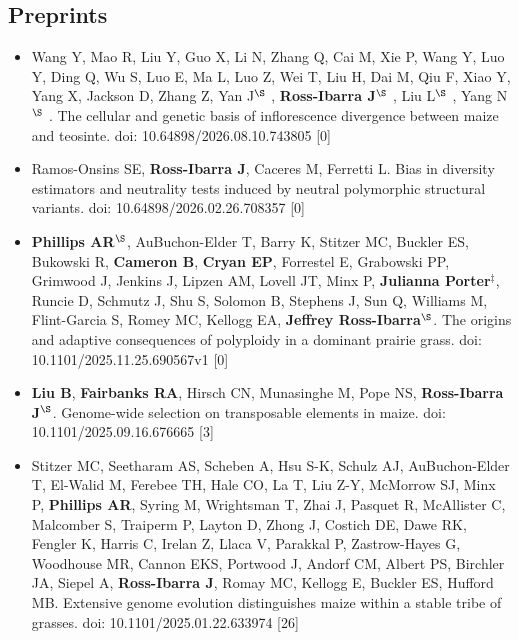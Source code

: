 \documentclass[letterpaper,10pt]{article}
\begin{document}
\subsection*{Preprints}
\begin{itemize}
  \setlength\itemsep{0ex}

\item Wang Y, Mao R, Liu Y, Guo X, Li N, Zhang Q, Cai M, Xie P, Wang Y, Luo Y, Ding Q, Wu S, Luo E, Ma L, Luo Z, Wei T, Liu H, Dai M, Qiu F, Xiao Y, Yang X, Jackson D, Zhang Z, Yan J$^\S$ , \textbf{Ross-Ibarra J}$^\S$ , Liu L$^\S$ , Yang N$^\S$ . The cellular and genetic basis of inflorescence divergence between maize and teosinte. doi: 10.64898/2026.08.10.743805 [0]\\

\item Ramos-Onsins SE, \textbf{Ross-Ibarra J}, Caceres M, Ferretti L. Bias in diversity estimators and neutrality tests induced by neutral polymorphic structural variants. doi: 10.64898/2026.02.26.708357 [0]\\

\item \textbf{Phillips AR}$^\S$,  AuBuchon-Elder T, Barry K,  Stitzer MC, Buckler ES,  Bukowski R, \textbf{Cameron B},  \textbf{Cryan EP},  Forrestel E, Grabowski PP,  Grimwood J,  Jenkins J, Lipzen AM,  Lovell JT,  Minx P, \textbf{Julianna Porter}$^\ddagger$,  Runcie D,  Schmutz J,  Shu S,  Solomon B,  Stephens J,  Sun Q,  Williams M,  Flint-Garcia S, Romey MC, Kellogg EA, \textbf{Jeffrey Ross-Ibarra}$^\S$. The origins and adaptive consequences of polyploidy in a dominant prairie grass.  doi: 10.1101/2025.11.25.690567v1 [0]\\

\item \textbf{Liu B}, \textbf{Fairbanks RA}, Hirsch CN, Munasinghe M, Pope NS, \textbf{Ross-Ibarra J}$^\S$. Genome-wide selection on transposable elements in maize.  doi: 10.1101/2025.09.16.676665  [3]\\
  
\item Stitzer MC, Seetharam AS, Scheben A, Hsu S-K, Schulz AJ, AuBuchon-Elder T,   El-Walid M, Ferebee TH, Hale CO,  La T,  Liu Z-Y,  McMorrow SJ,  Minx P, \textbf{Phillips AR},  Syring M,  Wrightsman T,  Zhai J,  Pasquet R,  McAllister C,  Malcomber S,  Traiperm P,  Layton D,  Zhong J,  Costich DE, Dawe RK,  Fengler K,  Harris C,  Irelan Z,  Llaca V,  Parakkal P,  Zastrow-Hayes G,  Woodhouse MR,  Cannon EKS,  Portwood J,  Andorf CM,  Albert PS, Birchler JA,  Siepel A, \textbf{Ross-Ibarra J}, Romay MC,  Kellogg E,  Buckler ES, Hufford MB.  Extensive genome evolution distinguishes maize within a stable tribe of grasses.  doi: 10.1101/2025.01.22.633974   [26]\\

\end{itemize}
\end{document}
